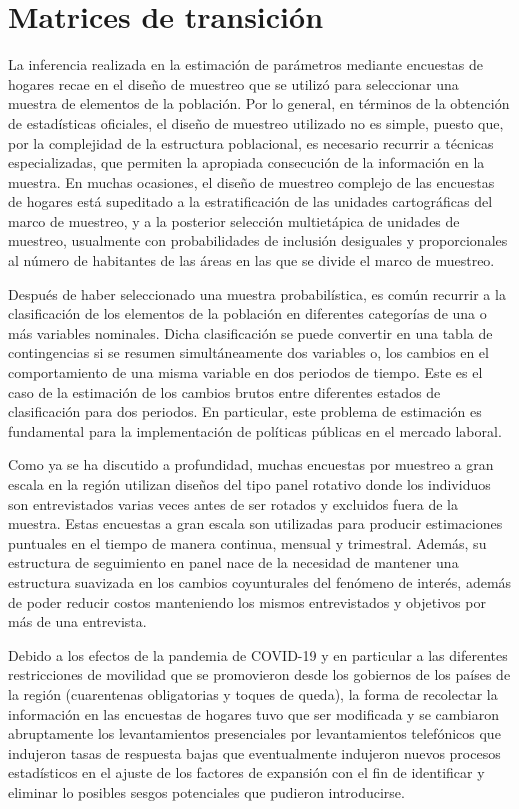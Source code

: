 \documentclass[
  12pt,
]{book}
\begin{document}
\hypertarget{matrices-de-transiciuxf3n}{%
\section{Matrices de transición}\label{matrices-de-transiciuxf3n}}

La inferencia realizada en la estimación de parámetros mediante encuestas de hogares recae en el diseño de muestreo que se utilizó para seleccionar una muestra de elementos de la población. Por lo general, en términos de la obtención de estadísticas oficiales, el diseño de muestreo utilizado no es simple, puesto que, por la complejidad de la estructura poblacional, es necesario recurrir a técnicas especializadas, que permiten la apropiada consecución de la información en la muestra. En muchas ocasiones, el diseño de muestreo complejo de las encuestas de hogares está supeditado a la estratificación de las unidades cartográficas del marco de muestreo, y a la posterior selección multietápica de unidades de muestreo, usualmente con probabilidades de inclusión desiguales y proporcionales al número de habitantes de las áreas en las que se divide el marco de muestreo.

Después de haber seleccionado una muestra probabilística, es común recurrir a la clasificación de los elementos de la población en diferentes categorías de una o más variables nominales. Dicha clasificación se puede convertir en una tabla de contingencias si se resumen simultáneamente dos variables o, los cambios en el comportamiento de una misma variable en dos periodos de tiempo. Este es el caso de la estimación de los cambios brutos entre diferentes estados de clasificación para dos periodos. En particular, este problema de estimación es fundamental para la implementación de políticas públicas en el mercado laboral.

Como ya se ha discutido a profundidad, muchas encuestas por muestreo a gran escala en la región utilizan diseños del tipo panel rotativo donde los individuos son entrevistados varias veces antes de ser rotados y excluidos fuera de la muestra. Estas encuestas a gran escala son utilizadas para producir estimaciones puntuales en el tiempo de manera continua, mensual y trimestral. Además, su estructura de seguimiento en panel nace de la necesidad de mantener una estructura suavizada en los cambios coyunturales del fenómeno de interés, además de poder reducir costos manteniendo los mismos entrevistados y objetivos por más de una entrevista.

Debido a los efectos de la pandemia de COVID-19 y en particular a las diferentes restricciones de movilidad que se promovieron desde los gobiernos de los países de la región (cuarentenas obligatorias y toques de queda), la forma de recolectar la información en las encuestas de hogares tuvo que ser modificada y se cambiaron abruptamente los levantamientos presenciales por levantamientos telefónicos que indujeron tasas de respuesta bajas que eventualmente indujeron nuevos procesos estadísticos en el ajuste de los factores de expansión con el fin de identificar y eliminar lo posibles sesgos potenciales que pudieron introducirse.
\end{document}
